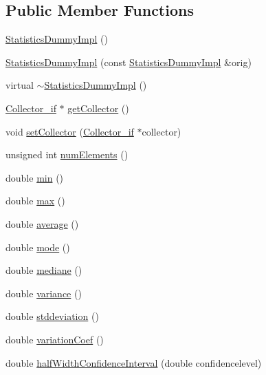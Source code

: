 \subsection*{Public Member Functions}
\begin{DoxyCompactItemize}
\item 
\hyperlink{class_statistics_dummy_impl_aa5ac252802bcd91b38f417ce082aa660}{Statistics\+Dummy\+Impl} ()
\item 
\hyperlink{class_statistics_dummy_impl_ab6420f6f66106745b6a2dce68bd6f0ed}{Statistics\+Dummy\+Impl} (const \hyperlink{class_statistics_dummy_impl}{Statistics\+Dummy\+Impl} \&orig)
\item 
virtual \hyperlink{class_statistics_dummy_impl_aa338e74273bf1ddffa467959b35c836a}{$\sim$\+Statistics\+Dummy\+Impl} ()
\item 
\hyperlink{class_collector__if}{Collector\+\_\+if} $\ast$ \hyperlink{class_statistics_dummy_impl_ac17e897d6131550bcdf5b2243c26a43b}{get\+Collector} ()
\item 
void \hyperlink{class_statistics_dummy_impl_a6a6d3fc91a7afe22cb66d10760891fa0}{set\+Collector} (\hyperlink{class_collector__if}{Collector\+\_\+if} $\ast$collector)
\item 
unsigned int \hyperlink{class_statistics_dummy_impl_a6669b3555223a6104fb31edacf577553}{num\+Elements} ()
\item 
double \hyperlink{class_statistics_dummy_impl_afa54fbcf5b2cd94cd31144ceea0d3617}{min} ()
\item 
double \hyperlink{class_statistics_dummy_impl_a5aa9311e22a79c8287ce77a5be16902b}{max} ()
\item 
double \hyperlink{class_statistics_dummy_impl_a6a92fc5fc549b4e674e95d03e0adf6e3}{average} ()
\item 
double \hyperlink{class_statistics_dummy_impl_acd482a6fa39b3ada3df4d2f2720896eb}{mode} ()
\item 
double \hyperlink{class_statistics_dummy_impl_a464109b84c8994089f3a288be6c8ee77}{mediane} ()
\item 
double \hyperlink{class_statistics_dummy_impl_a205e3cb135b3bea12d03826964930069}{variance} ()
\item 
double \hyperlink{class_statistics_dummy_impl_aecd1ae947272fe51658fbac3cb3647e8}{stddeviation} ()
\item 
double \hyperlink{class_statistics_dummy_impl_af1dff0a22b596cfca7aa123757f35d05}{variation\+Coef} ()
\item 
double \hyperlink{class_statistics_dummy_impl_a1c4042f54bf3c420da0b6fdca482e474}{half\+Width\+Confidence\+Interval} (double confidencelevel)

\end{DoxyCompactItemize}
